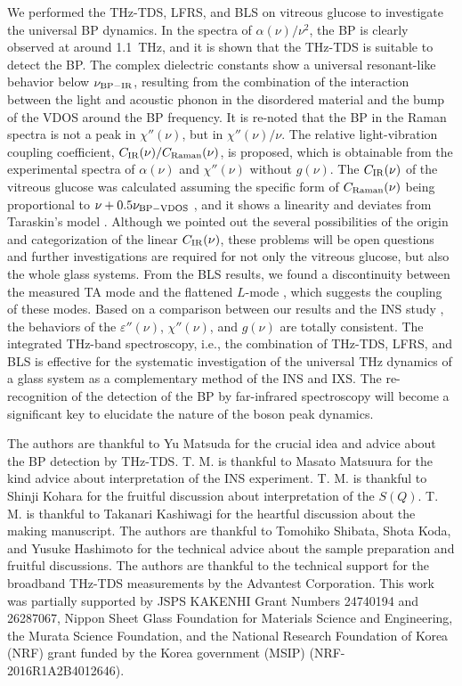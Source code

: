 \documentclass[%
 reprint,
superscriptaddress,
 amsmath,amssymb,
 aps,
prb,
]{revtex4-1}
\begin{document}
We performed the THz-TDS, LFRS, and BLS on vitreous glucose to investigate the universal BP dynamics.
In the spectra of $\alpha(\nu)/\nu^{2}$, the BP is clearly observed at around 1.1~THz, and it is shown that the THz-TDS is suitable to detect the BP.
The complex dielectric constants show a universal resonant-like behavior below $\nu_{\rm BP-IR}$, resulting from the combination of the interaction between the light and acoustic phonon in the disordered material and the bump of the VDOS around the BP frequency.
It is re-noted that the BP in the Raman spectra is not a peak in $\chi''(\nu)$, but in $\chi''(\nu)/\nu$.
The relative light-vibration coupling coefficient, $C_{\rm IR}(\nu)/C_{\rm Raman}(\nu)$, is proposed, which is obtainable from the experimental spectra of $\alpha(\nu)$ and $\chi''(\nu)$ without $g(\nu)$.
The $C_{\rm IR}(\nu)$ of the vitreous glucose was calculated assuming the specific form of $C_{\rm Raman}(\nu)$ being proportional to $\nu+0.5\nu_{\rm BP-VDOS}$ \cite{Surovtsev2002}, and it shows a linearity and deviates from Taraskin's model \cite{Taraskin2006}.
Although we pointed out the several possibilities of the origin and categorization of the linear $C_{\rm IR}(\nu)$, these problems will be open questions and further investigations are required for not only the vitreous glucose, but also the whole glass systems.
From the BLS results, we found a discontinuity between the measured TA mode and the flattened $L$-mode \cite{Violini2012}, which suggests the coupling of these modes.
Based on a comparison between our results and the INS study \cite{Violini2012}, the behaviors of the $\varepsilon''(\nu)$, $\chi''(\nu)$, and $g(\nu)$ are totally consistent.
The integrated THz-band spectroscopy, i.e., the combination of THz-TDS, LFRS, and BLS is effective for the systematic investigation of the universal THz dynamics of a glass system as a complementary method of the INS and IXS.
The re-recognition of the detection of the BP by far-infrared spectroscopy will become a significant key to elucidate the nature of the boson peak dynamics.

\begin{acknowledgments}
The authors are thankful to Yu Matsuda for the crucial idea and advice about the BP detection by THz-TDS. T. M. is thankful to Masato Matsuura for the kind advice about interpretation of the INS experiment. T. M. is thankful to Shinji Kohara for the fruitful discussion about interpretation of the $S(Q)$. T. M. is thankful to Takanari Kashiwagi for the heartful discussion about the making manuscript. The authors are thankful to Tomohiko Shibata, Shota Koda, and Yusuke Hashimoto for the technical advice about the sample preparation and fruitful discussions. The authors are thankful to the technical support for the broadband THz-TDS measurements by the Advantest Corporation. This work was partially supported by JSPS KAKENHI Grant Numbers 24740194 and 26287067, Nippon Sheet Glass Foundation for Materials Science and Engineering, the Murata Science Foundation, and the National Research Foundation of Korea (NRF) grant funded by the Korea government (MSIP) (NRF-2016R1A2B4012646).
\end{acknowledgments}


\end{document}
